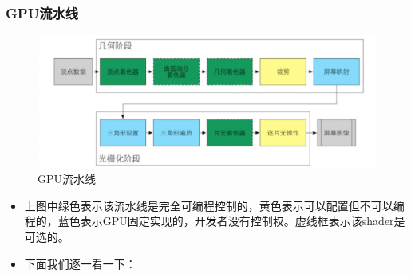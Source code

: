 \documentclass[9pt, b5paper]{article}
\begin{document}
\subsubsection{GPU流水线}
\label{sec-1-2-2}
\begin{figure}[htb]
\centering
\includegraphics[width=.9\linewidth]{./pic/gpuPipeline.png}
\caption{GPU流水线}
\end{figure}
\begin{itemize}
\item 上图中绿色表示该流水线是完全可编程控制的，黄色表示可以配置但不可以编程的，蓝色表示GPU固定实现的，开发者没有控制权。虚线框表示该shader是可选的。
\item 下面我们逐一看一下：
\end{itemize}
\end{document}
